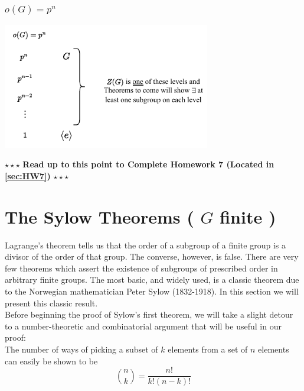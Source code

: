 \subsubsection*{$o(G)=p^n$}
\begin{center}
    \includegraphics[width=0.68\textwidth]{Figures/prime_power_order_lattice.pdf}
\end{center}
\begin{tcolorbox}
    \begin{center}
        $\star\star\star$ \textbf{Read up to this point to Complete Homework 7 (Located in \ref{sec:HW7})} $\star\star\star$
    \end{center}
\end{tcolorbox}

\section{\texorpdfstring{The Sylow Theorems ( $G$ finite )}{The Sylow Theorems ( G finite )}}
Lagrange's theorem tells us that the order of a subgroup of a finite group is a divisor of the order of that group. The converse, however, is false. There are very few theorems which assert the existence of subgroups of prescribed order in arbitrary finite groups. The most basic, and widely used, is a classic theorem due to the Norwegian mathematician Peter Sylow (1832-1918).
In this section we will present this classic result. \\

\noindent Before beginning the proof of Sylow's first theorem, we will take a slight detour to a number-theoretic and combinatorial argument that will be useful in our proof: \\
The number of ways of picking a subset of $k$ elements from a set of $n$ elements can easily be shown to be 
\begin{equation}
    {n \choose k} = {\frac{n!}{k!(n-k)!}} \nonumber
\end{equation}

